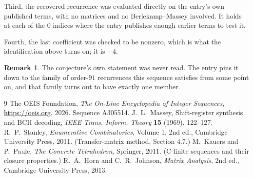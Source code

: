 \documentclass[11pt,a4paper]{article}
\theoremstyle{plain}
\theoremstyle{definition}
\newtheorem{remark}[theorem]{Remark}
\begin{document}
Third, the recovered recurrence was evaluated directly on the entry's own published terms, with
no matrices and no Berlekamp--Massey involved. It holds at each of the $0$ indices where
the entry publishes enough earlier terms to test it.

Fourth, the last coefficient was checked to be nonzero, which is what the identification above
turns on; it is $-4$.

\begin{remark}
The conjecture's own statement was never read. The entry pins it down to the family of
order-$91$ recurrences this sequence satisfies from some point on, and that family turns
out to have exactly one member.
\end{remark}

\begin{thebibliography}{9}
 The OEIS Foundation, \emph{The On-Line Encyclopedia of Integer
Sequences}, \url{https://oeis.org}, 2026. Sequence A305514.
 J.~L.~Massey, Shift-register synthesis and BCH decoding, \emph{IEEE
Trans. Inform. Theory} \textbf{15} (1969), 122--127.
 R.~P.~Stanley, \emph{Enumerative Combinatorics}, Volume 1, 2nd ed.,
Cambridge University Press, 2011. (Transfer-matrix method, Section 4.7.)
 M.~Kauers and P.~Paule, \emph{The Concrete Tetrahedron}, Springer, 2011.
(C-finite sequences and their closure properties.)
 R.~A.~Horn and C.~R.~Johnson, \emph{Matrix Analysis}, 2nd ed., Cambridge
University Press, 2013.
\end{thebibliography}
\end{document}
